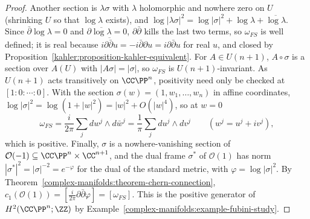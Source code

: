 \begin{proof}
Another section is $\lambda\sigma$ with $\lambda$ holomorphic and nowhere zero on $U$ (shrinking $U$ so that $\log\lambda$ exists), and
$\log|\lambda\sigma|^2 = \log|\sigma|^2 + \log\lambda + \overline{\log\lambda}$. Since $\bar\partial\log\lambda = 0$ and
$\partial\overline{\log\lambda} = 0$, $\partial\bar\partial$ kills the last two terms, so $\omega_{FS}$ is well defined; it is real because
$\overline{i\partial\bar\partial u} = -i\bar\partial\partial u = i\partial\bar\partial u$ for real $u$, and closed by
Proposition~\ref{kahler:proposition-kahler-equivalent}. For $A \in U(n+1)$, $A \circ \sigma$ is a section over $A(U)$ with
$|A\sigma| = |\sigma|$, so $\omega_{FS}$ is $U(n+1)$-invariant. As $U(n+1)$ acts transitively on $\CC\PP^n$, positivity need only be checked
at $[1 : 0 : \cdots : 0]$. With the section $\sigma(w) = (1, w_1, \ldots, w_n)$ in affine coordinates,
$\log|\sigma|^2 = \log(1 + |w|^2) = |w|^2 + O(|w|^4)$, so at $w = 0$
\[
\omega_{FS} = \frac{i}{2\pi}\sum_jdw^j \wedge d\bar w^j = \frac1\pi\sum_jdu^j \wedge dv^j \qquad (w^j = u^j + iv^j),
\]
which is positive. Finally, $\sigma$ is a nowhere-vanishing section of $\mathcal{O}(-1) \subseteq \CC\PP^n \times \CC^{n+1}$, and the dual
frame $\sigma^*$ of $\mathcal{O}(1)$ has norm $|\sigma^*|^2 = |\sigma|^{-2} = e^{-\varphi}$ for the dual of the standard metric, with
$\varphi = \log|\sigma|^2$. By Theorem~\ref{complex-manifolds:theorem-chern-connection}, $c_1(\mathcal{O}(1)) = [\frac{i}{2\pi}\partial\bar\partial\varphi] = [\omega_{FS}]$.
This is the positive generator of $H^2(\CC\PP^n; \ZZ)$ by Example~\ref{complex-manifolds:example-fubini-study}.
\end{proof}

